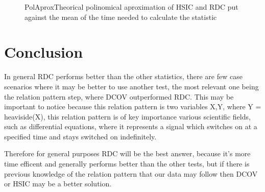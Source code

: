 \begin{figure}[Polinomical aproximation for HSIC and RDC time curve]{PolAprox}{Theorical polinomical aproximation of HSIC and RDC put against the mean of the time needed to calculate the statistic}
\end{figure}

\section{Conclusion}

In general RDC performs better than the other statistics, there are few case scenarios where it may be better to use another test, the most relevant one being the relation pattern step, where DCOV outperformed RDC. This may be important to notice because this relation pattern is two variables X,Y, where Y = heaviside(X), this relation pattern is of key importance various scientific fields, such as differential equations, where it represents a signal which switches on at a specified time and stays switched on indefinitely. 

Therefore for general purposes RDC will be the best answer, because it's more time efficent and generally performs better than the other tests, but if there is previous knowledge of the relation pattern that our data may follow then DCOV or HSIC may be a better solution.